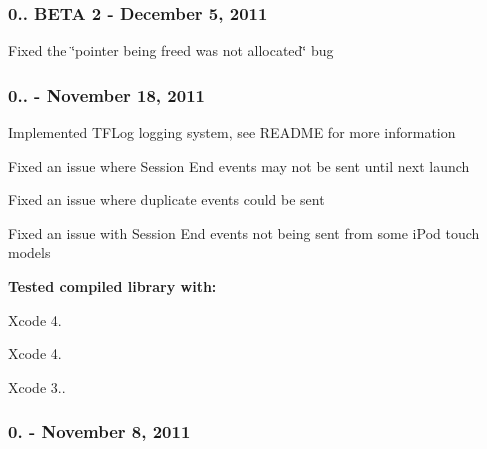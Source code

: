 \subsubsection*{0.. B\-E\-T\-A 2 -\/ December 5, 2011}


\begin{DoxyItemize}
\item Fixed the \char`\"{}pointer being freed was not allocated\char`\"{} bug
\end{DoxyItemize}

\subsubsection*{0.. -\/ November 18, 2011}


\begin{DoxyItemize}
\item Implemented T\-F\-Log logging system, see R\-E\-A\-D\-M\-E for more information
\item Fixed an issue where Session End events may not be sent until next launch
\item Fixed an issue where duplicate events could be sent
\item Fixed an issue with Session End events not being sent from some i\-Pod touch models
\end{DoxyItemize}

{\bfseries Tested compiled library with\-:}


\begin{DoxyItemize}
\item Xcode 4.
\item Xcode 4.
\item Xcode 3..
\end{DoxyItemize}

\subsubsection*{0. -\/ November 8, 2011}


